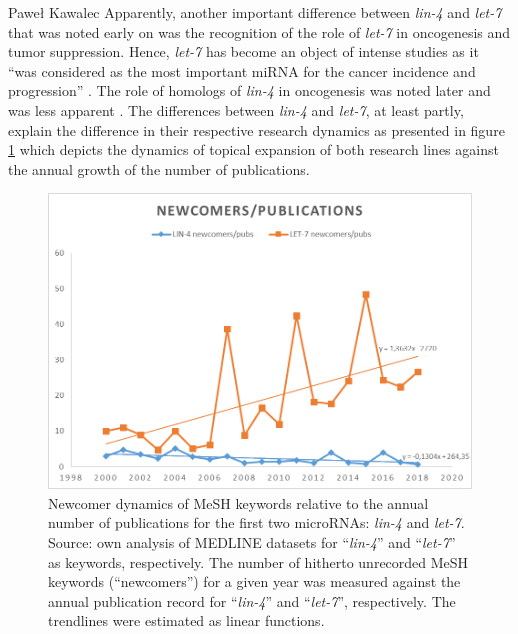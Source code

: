 \begin{artengenv}{Paweł Kawalec}
Apparently, another important difference between \textit{lin-4} and \textit{let-7} that was noted early on was the recognition of the role of \textit{let-7} in oncogenesis and tumor suppression. Hence, \textit{let-7} has become an object of intense studies as it ``was considered as the most important miRNA for the cancer incidence and progression''
\parencite[][]{wang_comprehensive_2018}. %
 The role of homologs of \textit{lin-4} in oncogenesis was noted later and was less apparent 
\parencite[][]{sonoki_insertion_2005}. %
 The differences between \textit{lin-4} and \textit{let-7}, at least partly, explain the difference in their respective research dynamics as presented in figure \ref{fig3kawalec} which depicts the dynamics of topical expansion of both research lines against the annual growth of the number of publications.
\begin{figure}[h!]
	\includegraphics[width=1\textwidth]{ART_Kawalec/Kawalec-img004.png}
	\caption{Newcomer dynamics of MeSH keywords relative to the annual number of publications for the first two microRNAs: \textit{lin-4} and \textit{let-7}. Source: own analysis of MEDLINE datasets for ``\textit{lin-4}'' and ``\textit{let-7}'' as keywords, respectively. The number of hitherto unrecorded MeSH keywords (``newcomers'') for a given year was measured against the annual publication record for ``\textit{lin-4}'' and ``\textit{let-7}'', respectively. The trendlines were estimated as linear functions.}\label{fig3kawalec}
\end{figure}


\end{artengenv}
